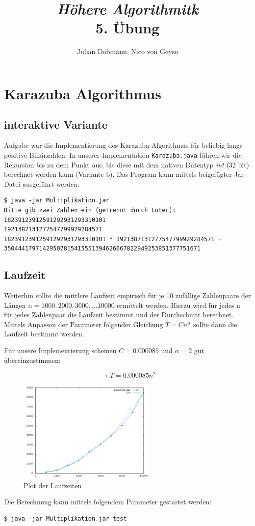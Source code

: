 \documentclass[a4paper,10pt]{scrartcl}
\title{\textit{Höhere Algorithmitk}\\ 5. Übung}
\author{Julian Dobmann, Nico von Geyso}
\begin{document}
\maketitle

\section{Karazuba Algorithmus}

\subsection{interaktive Variante}

Aufgabe war die Implementierung des Karazuba-Algorithmus für beliebig lange
positive Binärzahlen. In unserer Implementation \texttt{Karazuba.java} führen
wir die Rekursion bis zu dem Punkt aus, bis diese mit dem nativen Datentyp
\textit{int} (32 bit) berechnet werden kann (Variante b). Das Program kann
mittels beigefügter Jar-Datei ausgeführt werden:

\begin{verbatim}$ java -jar Multiplikation.jar
Bitte gib zwei Zahlen ein (getrennt durch Enter):
18239123912591292931293310101
1921387131277547799929284571
18239123912591292931293310101 * 1921387131277547799929284571 =
35044417971429507815415551394626667822949253851377751671\end{verbatim}

\subsection{Laufzeit}

Weiterhin sollte die mittlere Laufzeit empirisch für je 10 zufällige Zahlenpaare der
Längen $n = 1000, 2000, 3000, ... 10000$ ermittelt werden. Hierzu wird für jedes
n für jedes Zahlenpaar die Laufzeit bestimmt und der Durchschnitt berechnet.
Mittels Anpassen der Parameter folgender Gleichung $T = Cn^\alpha$ sollte dann
die Laufzeit bestimmt werden.

Für unsere Implementierung scheinen $C=0.000085$ und $\alpha=2$ gut
übereinzustimmen:

$$\rightarrow T = 0.000085 n^2$$

\newpage

\begin{figure}[ht!]
  \centering
  \includegraphics[width=0.6\textwidth]{plot.png}
  \caption{Plot der Laufzeiten}
\end{figure}

Die Berechnung kann mittels folgendem Parameter gestartet werden:

\begin{verbatim}$ java -jar Multiplikation.jar test\end{verbatim}
\end{document}
